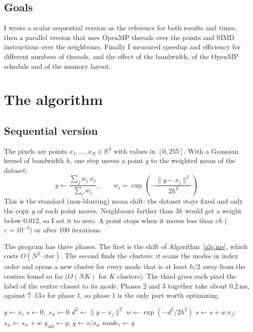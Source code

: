 \documentclass[10pt,twocolumn,letterpaper]{article}
\begin{document}
\subsection{Goals}
I wrote a scalar sequential version as the reference for both results and times, then a parallel
version that uses OpenMP threads over the points and SIMD instructions over the neighbours.
Finally I measured speedup and efficiency for different numbers of threads, and the effect of the
bandwidth, of the OpenMP schedule and of the memory layout.

\section{The algorithm}

\subsection{Sequential version}
The pixels are points $x_1,\dots,x_N \in \mathbb{R}^3$ with values in $[0,255]$. With a Gaussian
kernel of bandwidth $h$, one step moves a point $y$ to the weighted mean of the dataset:
\begin{equation}
    y \leftarrow \frac{\sum_{j} w_j\, x_j}{\sum_j w_j}, \qquad
    w_j = \exp\!\left(-\frac{\|y - x_j\|^2}{2h^2}\right).
    \label{eq:shift}
\end{equation}
This is the standard (non-blurring) mean shift: the dataset stays fixed and only the copy $y$ of
each point moves. Neighbours farther than $3h$ would get a weight below 0.012, so I set it to zero.
A point stops when it moves less than $\varepsilon h$ ($\varepsilon = 10^{-3}$) or after 100
iterations.

The program has three phases. The first is the shift of Algorithm~\ref{alg:ms}, which costs
$O(N^2 \cdot \text{iter})$. The second finds the clusters: it scans the modes in index order and
opens a new cluster for every mode that is at least $h/2$ away from the centres found so far
($O(NK)$ for $K$ clusters). The third gives each pixel the label of the centre closest to its mode.
Phases 2 and 3 together take about 0.2\,ms, against 7--13\,s for phase 1, so phase 1 is the only
part worth optimizing.

\begin{algorithm}[!htb]
\caption{Shift phase of mean shift}
\label{alg:ms}
\begin{algorithmic}[1]
 
  \State $y \gets x_i$
  \Repeat
    \State $s \gets 0,\; s_w \gets 0$
     
      \State $d^2 \gets \|y - x_j\|^2$
        \State $w \gets \exp(-d^2 / 2h^2)$
        \State $s \gets s + w\,x_j$;\; $s_w \gets s_w + w$
      \EndIf
    \EndFor
    \State $y_{old} \gets y$;\; $y \gets s / s_w$
  \State $mode_i \gets y$
\EndFor
\end{algorithmic}
\end{algorithm}
\end{document}
